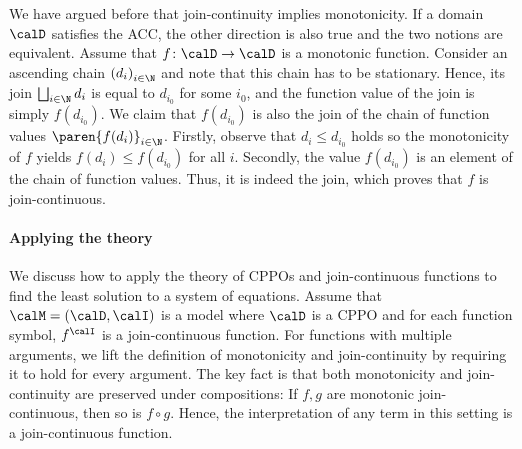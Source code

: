 \documentclass[../../diss.tex]{subfiles}
\begin{document}
\begin{remark}%
\label{Remark:EDSMonotonocityContinuity}%
    We have argued before that join-continuity implies monotonicity.
    If a domain $\domain$ satisfies the ACC, the other direction is also true and the two notions are equivalent.
    Assume that $f \colon \domain \to \domain$ is a monotonic function.
    Consider an ascending chain ${(d_i)}_{i \in \N}$ and note that this chain has to be stationary.
    Hence, its join $\bigsqcup_{i \in \N} d_i$ is equal to $d_{i_0}$ for some $i_0$, and the function value of the join is simply $f (d_{i_0})$.
    We claim that $f (d_{i_0})$ is also the join of the chain of function values ${\paren{f (d_{i})}}_{i \in \N}$.
    Firstly, observe that $d_i \leq d_{i_0}$ holds so the monotonicity of $f$ yields $f (d_{i}) \leq f (d_{i_0})$ for all $i$.
    Secondly, the value $f (d_{i_0})$ is an element of the chain of function values.
    Thus, it is indeed the join, which proves that $f$ is join-continuous.
\end{remark}

\paragraph{Applying the theory}

We discuss how to apply the theory of CPPOs and join-continuous functions to find the least solution to a system of equations.
Assume that $\model = (\domain,\interpretation)$ is a model where $\domain$ is a CPPO and for each function symbol, $f^\interpretation$ is a join-continuous function.
For functions with multiple arguments, we lift the definition of monotonicity and join-continuity by requiring it to hold for every argument.
The key fact is that both monotonicity and join-continuity are preserved under compositions: If $f,g$ are monotonic \resp join-continuous, then so is $f \circ g$.
Hence, the interpretation of any term in this setting is a join-continuous function.
\end{document}
